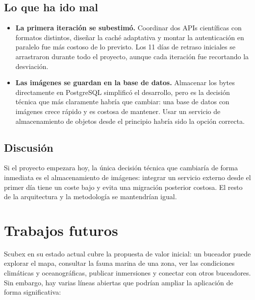 \subsection{Lo que ha ido mal}

\begin{itemize}

\item \textbf{La primera iteración se subestimó.} Coordinar dos APIs científicas con formatos distintos, diseñar la caché adaptativa y montar la autenticación en paralelo fue más costoso de lo previsto. Los 11 días de retraso iniciales se arrastraron durante todo el proyecto, aunque cada iteración fue recortando la desviación.

\item \textbf{Las imágenes se guardan en la base de datos.} Almacenar los bytes directamente en PostgreSQL simplificó el desarrollo, pero es la decisión técnica que más claramente habría que cambiar: una base de datos con imágenes crece rápido y es costosa de mantener. Usar un servicio de almacenamiento de objetos desde el principio habría sido la opción correcta.

\end{itemize}

\subsection{Discusión}

Si el proyecto empezara hoy, la única decisión técnica que cambiaría de forma inmediata es el almacenamiento de imágenes: integrar un servicio externo desde el primer día tiene un coste bajo y evita una migración posterior costosa. El resto de la arquitectura y la metodología se mantendrían igual.

\section{Trabajos futuros}

Scubex en su estado actual cubre la propuesta de valor inicial: un buceador puede explorar el mapa, consultar la fauna marina de una zona, ver las condiciones climáticas y oceanográficas, publicar inmersiones y conectar con otros buceadores. Sin embargo, hay varias líneas abiertas que podrían ampliar la aplicación de forma significativa:

